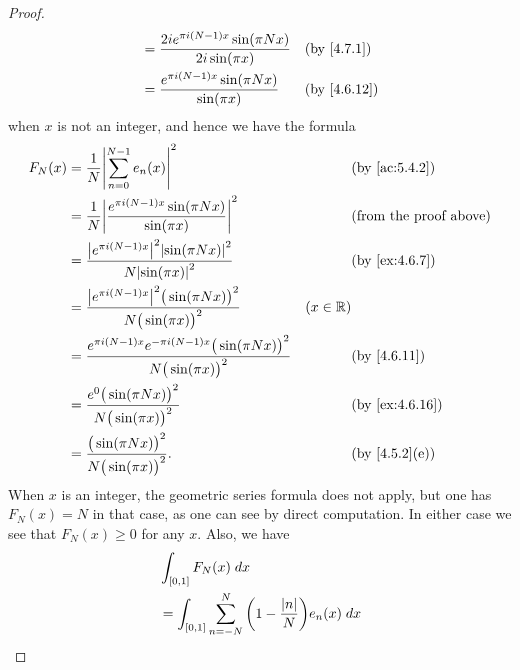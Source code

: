 \begin{proof}
\begin{align*}
                                & = \dfrac{2i e^{\pi i (N - 1) x} \sin(\pi N x)}{2i \sin(\pi x)}                                                           &  & \by{4.7.1}                  \\
                                & = \dfrac{e^{\pi i (N - 1) x} \sin(\pi N x)}{\sin(\pi x)}                                                                 &  & \by{4.6.12}
  \end{align*}
  when \(x\) is not an integer, and hence we have the formula
  \begin{align*}
    F_N(x) & = \dfrac{1}{N} \abs{\sum_{n = 0}^{N - 1} e_n(x)}^2                                                       &            & \by{ac:5.4.2}                 \\
           & = \dfrac{1}{N} \abs{\dfrac{e^{\pi i (N - 1) x} \sin(\pi N x)}{\sin(\pi x)}}^2                            &            & \text{(from the proof above)} \\
           & = \dfrac{\abs{e^{\pi i (N - 1) x}}^2 \abs{\sin(\pi N x)}^2}{N \abs{\sin(\pi x)}^2}                       &            & \by{ex:4.6.7}                 \\
           & = \dfrac{\abs{e^{\pi i (N - 1) x}}^2 \big(\sin(\pi N x)\big)^2}{N \big(\sin(\pi x)\big)^2}               & (x \in \R)                                 \\
           & = \dfrac{e^{\pi i (N - 1) x} e^{- \pi i (N - 1) x} \big(\sin(\pi N x)\big)^2}{N \big(\sin(\pi x)\big)^2} &            & \by{4.6.11}                   \\
           & = \dfrac{e^0 \big(\sin(\pi N x)\big)^2}{N \big(\sin(\pi x)\big)^2}                                       &            & \by{ex:4.6.16}                \\
           & = \dfrac{\big(\sin(\pi N x)\big)^2}{N \big(\sin(\pi x)\big)^2}.                                          &            & \text{(by \cref{4.5.2}(e))}
  \end{align*}
  When \(x\) is an integer, the geometric series formula does not apply, but one has \(F_N(x) = N\) in that case, as one can see by direct computation.
  In either case we see that \(F_N(x) \geq 0\) for any \(x\).
  Also, we have
  \begin{align*}
     & \int_{[0, 1]} F_N(x) \; dx                                                                                                                 \\
     & = \int_{[0, 1]} \sum_{n = -N}^N \bigg(1 - \dfrac{\abs{n}}{N}\bigg) e_n(x) \; dx                                                            \\

\end{align*}
\end{proof}
